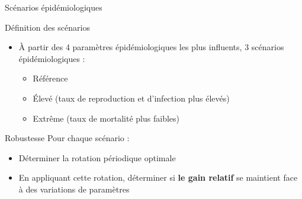 \begin{frame}{Scénarios épidémiologiques }

%
%        


\begin{block}{Définition des scénarios}
     \begin{itemize}
     \item À partir des 4  paramètres épidémiologiques les plus influents,  3 scénarios épidémiologiques :
 {\small \begin{itemize}[label=$\rightarrow$]
\item \textcolor{myblue4}{Référence}
\item \textcolor{mypink2}{Élevé} (taux de reproduction et d'infection plus élevés)
\item \textcolor{mypurple2}{Extrême}  (taux de mortalité plus faibles)
\end{itemize}}
\end{itemize}
   \end{block}
   
   \begin{block}{Robustesse}
Pour chaque scénario :
     \begin{itemize}
     \item Déterminer la rotation périodique optimale
     \item En appliquant cette rotation, déterminer si \textbf{le gain relatif} se maintient
face à des variations de paramètres
\end{itemize}
   \end{block}
   

\end{frame}

